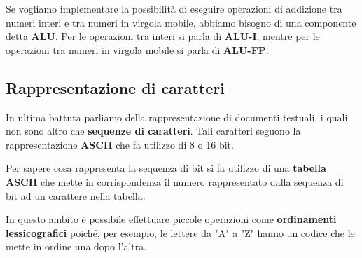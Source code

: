 Se vogliamo implementare la possibilità di eseguire operazioni di addizione tra numeri interi e tra
numeri in virgola mobile, abbiamo bisogno di una componente detta \textbf{ALU}. Per le operazioni
tra interi si parla di \textbf{ALU-I}, mentre per le operazioni tra numeri in virgola mobile si
parla di \textbf{ALU-FP}.

\subsection{Rappresentazione di caratteri}
In ultima battuta parliamo della rappresentazione di documenti testuali, i quali non sono altro
che \textbf{sequenze di caratteri}. Tali caratteri seguono la rappresentazione \textbf{ASCII} che
fa utilizzo di 8 o 16 bit.

Per sapere cosa rappresenta la sequenza di bit si fa utilizzo di una \textbf{tabella ASCII} che
mette in corrispondenza il numero rappresentato dalla sequenza di bit ad un carattere nella tabella.

In questo ambito è possibile effettuare piccole operazioni come \textbf{ordinamenti lessicografici}
poiché, per esempio, le lettere da "A" a "Z" hanno un codice che le mette in ordine una dopo
l'altra.